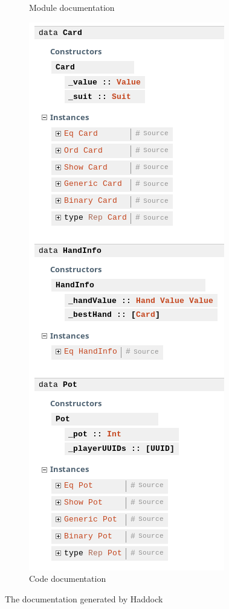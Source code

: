 \begin{figure}[H]
\begin{subfigure}[h]{0.4\textwidth}
        \caption{Module documentation}%
        \label{fig:modules}
    \end{subfigure}
    \begin{subfigure}[h]{0.4\textwidth}
        \includegraphics[width=\textwidth]{../images/documentation.png}
        \caption{Code documentation}%
        \label{fig:documentation}
    \end{subfigure}
    \caption{The documentation generated by Haddock}
    \label{fig:haddock}
\end{figure}

